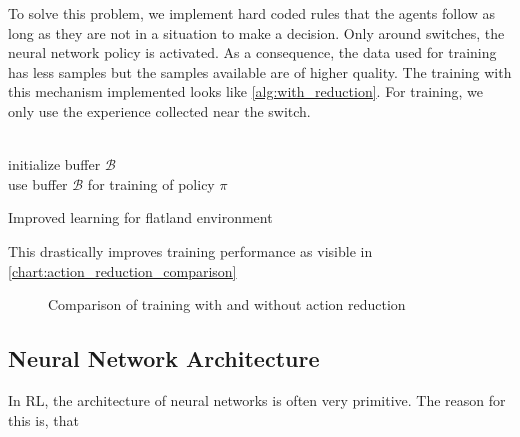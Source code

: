 To solve this problem, we implement hard coded rules that the agents follow as long as they are not in a situation to make a decision. Only around switches, the neural network policy is activated. As a consequence, the data used for training has less samples but the samples available are of higher quality. The training with this mechanism implemented looks like \autoref{alg:with_reduction}.
For training, we only use the experience collected near the switch.\\\\
\begin{algorithm}[H]
	initialize buffer $\mathcal{B}$\\
	use buffer $\mathcal{B}$ for training of policy $\pi$

	\caption{Improved learning for flatland environment}
	\label{alg:with_reduction}
\end{algorithm}
This drastically improves training performance as visible in \autoref{chart:action_reduction_comparison}
\begin{figure}
	\begin{center}
		
	\end{center}
	\caption{Comparison of training with and without action reduction}
	\label{chart:action_reduction_comparison}
\end{figure}

\subsection*{Neural Network Architecture}\label{network_architecture}
In RL, the architecture of neural networks is often very primitive. The reason for this is, that 


